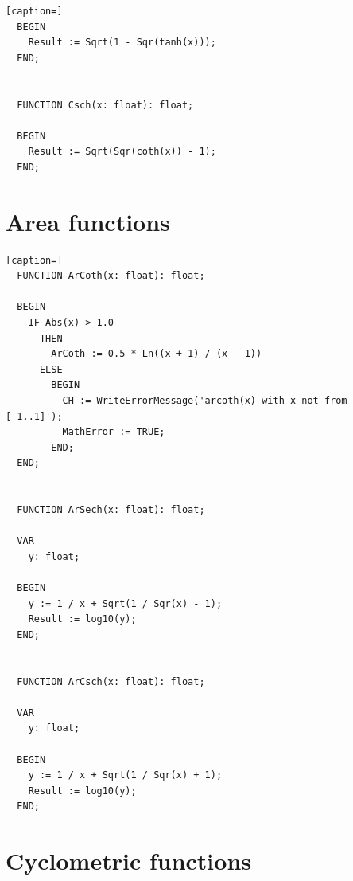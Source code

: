 \begin{refsection}
\begin{lstlisting}[caption=]
  BEGIN
    Result := Sqrt(1 - Sqr(tanh(x)));
  END;


  FUNCTION Csch(x: float): float;

  BEGIN
    Result := Sqrt(Sqr(coth(x)) - 1);
  END;
\end{lstlisting}

\section{Area functions}

\begin{lstlisting}[caption=]
  FUNCTION ArCoth(x: float): float;

  BEGIN
    IF Abs(x) > 1.0
      THEN
        ArCoth := 0.5 * Ln((x + 1) / (x - 1))
      ELSE
        BEGIN
          CH := WriteErrorMessage('arcoth(x) with x not from [-1..1]');
          MathError := TRUE;
        END;
  END;


  FUNCTION ArSech(x: float): float;

  VAR
    y: float;

  BEGIN
    y := 1 / x + Sqrt(1 / Sqr(x) - 1);
    Result := log10(y);
  END;


  FUNCTION ArCsch(x: float): float;

  VAR
    y: float;

  BEGIN
    y := 1 / x + Sqrt(1 / Sqr(x) + 1);
    Result := log10(y);
  END;
\end{lstlisting}

\section{Cyclometric functions}


\end{refsection}
